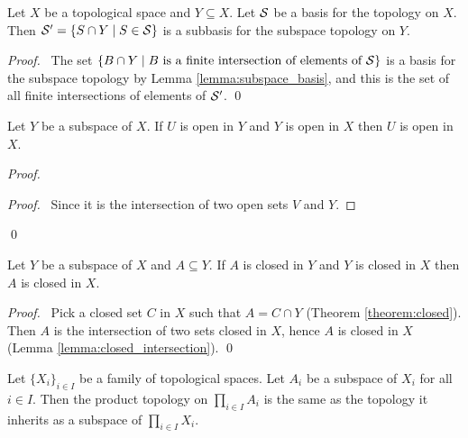 \begin{lemma}
    \label{lemma:subspace_subbasis}
    Let $X$ be a topological space and $Y \subseteq X$. Let $\mathcal{S}$ be a basis for the topology on $X$.
    Then $\mathcal{S}' = \{ S \cap Y \mid S \in \mathcal{S} \}$ is a subbasis for the subspace topology on $Y$.
\end{lemma}

\begin{proof}
    \pf\ The set $\{ B \cap Y \mid B \text{ is a finite intersection of elements of } \mathcal{S} \}$ is a basis
    for the subspace topology by Lemma \ref{lemma:subspace_basis}, and this is the set of all finite
    intersections of elements of $\mathcal{S}'$. \qed
\end{proof}

\begin{lemma}
    \label{lemma:subspace_open}
    Let $Y$ be a subspace of $X$. If $U$ is open in $Y$ and $Y$ is open in $X$ then $U$ is open in $X$.
\end{lemma}

\begin{proof}
    \pf
    \begin{proof}
        \pf\ Since it is the intersection of two open sets $V$ and $Y$.
    \end{proof}
    \qed
\end{proof}

\begin{theorem}
    \label{theorem:closed_subspace}
    Let $Y$ be a subspace of $X$ and $A \subseteq Y$. If $A$ is closed in $Y$ and $Y$ is closed in $X$
    then $A$ is closed in $X$.
\end{theorem}

\begin{proof}
    \pf\ Pick a closed set $C$ in $X$ such that $A = C \cap Y$ (Theorem \ref{theorem:closed}). Then
    $A$ is the intersection of two sets closed in $X$, hence $A$ is closed in $X$ (Lemma \ref{lemma:closed_intersection}). \qed
\end{proof}

\begin{theorem}
    Let $\{ X_i \}_{i \in I}$ be a family of topological spaces. Let $A_i$ be a subspace of $X_i$ for all $i \in I$.
    Then the product topology on $\prod_{i \in I} A_i$ is the same as the topology it inherits as a subspace of
    $\prod_{i \in I} X_i$.
\end{theorem}

